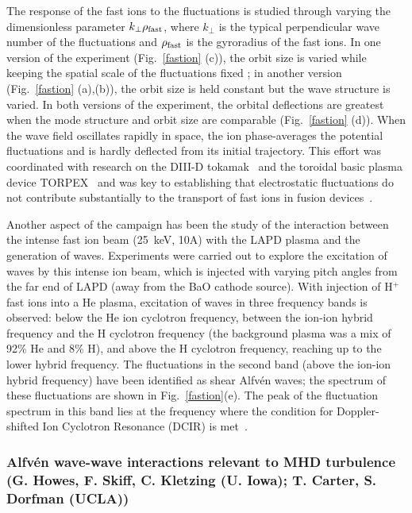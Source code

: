 \documentclass[11pt]{article}
\renewcommand{\cite}{\citep}
\begin{document}
The response of the fast ions to the fluctuations is studied through
varying the dimensionless parameter $k_\perp \rho_{\rm fast}$, where
$k_\perp$ is the typical perpendicular wave number of the fluctuations
and $\rho_{\rm fast}$ is the gyroradius of the fast ions.  
In one version of the experiment (Fig.~\ref{fastion} (c)), the orbit size is varied
while keeping the spatial scale of the fluctuations fixed ; in another version (Fig.~\ref{fastion} (a),(b)), the
orbit size is held constant but the wave structure is varied.  In both
versions of the experiment, the orbital deflections are greatest when
the mode structure and orbit size are comparable (Fig.~\ref{fastion} (d)).  When
the wave field oscillates rapidly in space, the ion phase-averages the potential
fluctuations and is hardly deflected from its initial trajectory.
This effort was coordinated with research on the DIII-D tokamak~\cite{pace:2013} and
the toroidal basic plasma device TORPEX~\cite{heidbrink:2012,bovet:2012} and was key to establishing
that electrostatic fluctuations do not contribute substantially to the
transport of fast ions in fusion devices~\cite{pace:2013}.

Another aspect of the campaign has been the study of the interaction
between the intense fast ion beam (25~keV, 10A) with the LAPD plasma and the
generation of waves.   Experiments were carried out to explore the excitation of waves by
this intense ion beam, which is injected with varying pitch angles
from the far end of LAPD (away from the BaO cathode source).  With
injection of H$^+$ fast ions into a He plasma, excitation of waves in
three frequency bands is observed:  below the He ion cyclotron
frequency, between the ion-ion hybrid frequency and the H cyclotron
frequency (the background plasma was a mix of 92\% He and 8\% H), and
above the H cyclotron frequency, reaching up to the lower hybrid
frequency.  The fluctuations in the second band (above the ion-ion
hybrid frequency) have been identified as shear Alfv\'{e}n waves; the
spectrum of these fluctuations are shown in Fig.~\ref{fastion}(e).
The peak of the fluctuation spectrum in this band lies at the
frequency where the condition for Doppler-shifted Ion Cyclotron
Resonance (DCIR) is met~\cite{tripathi:2015}.


\subsubsection{Alfv\'{e}n wave-wave interactions relevant to MHD turbulence (G.
Howes, F. Skiff, C. Kletzing (U. Iowa); T. Carter, S. Dorfman (UCLA))}
\end{document}
